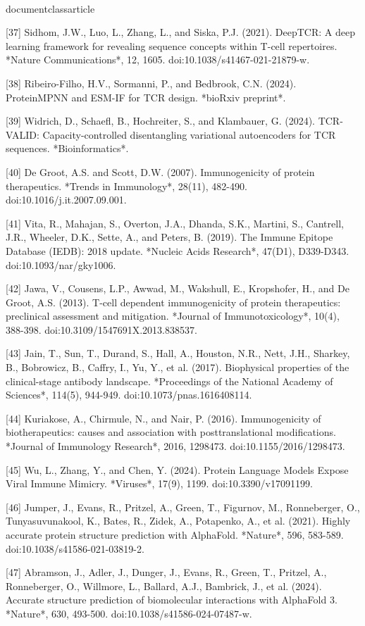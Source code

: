\\documentclass{article}
\begin{document}
[37] Sidhom, J.W., Luo, L., Zhang, L., and Siska, P.J. (2021). DeepTCR: A deep learning framework for revealing sequence concepts within T-cell repertoires. *Nature Communications*, 12, 1605. doi:10.1038/s41467-021-21879-w.

[38] Ribeiro-Filho, H.V., Sormanni, P., and Bedbrook, C.N. (2024). ProteinMPNN and ESM-IF for TCR design. *bioRxiv preprint*.

[39] Widrich, D., Schaefl, B., Hochreiter, S., and Klambauer, G. (2024). TCR-VALID: Capacity-controlled disentangling variational autoencoders for TCR sequences. *Bioinformatics*.

[40] De Groot, A.S. and Scott, D.W. (2007). Immunogenicity of protein therapeutics. *Trends in Immunology*, 28(11), 482-490. doi:10.1016/j.it.2007.09.001.

[41] Vita, R., Mahajan, S., Overton, J.A., Dhanda, S.K., Martini, S., Cantrell, J.R., Wheeler, D.K., Sette, A., and Peters, B. (2019). The Immune Epitope Database (IEDB): 2018 update. *Nucleic Acids Research*, 47(D1), D339-D343. doi:10.1093/nar/gky1006.

[42] Jawa, V., Cousens, L.P., Awwad, M., Wakshull, E., Kropshofer, H., and De Groot, A.S. (2013). T-cell dependent immunogenicity of protein therapeutics: preclinical assessment and mitigation. *Journal of Immunotoxicology*, 10(4), 388-398. doi:10.3109/1547691X.2013.838537.

[43] Jain, T., Sun, T., Durand, S., Hall, A., Houston, N.R., Nett, J.H., Sharkey, B., Bobrowicz, B., Caffry, I., Yu, Y., et al. (2017). Biophysical properties of the clinical-stage antibody landscape. *Proceedings of the National Academy of Sciences*, 114(5), 944-949. doi:10.1073/pnas.1616408114.

[44] Kuriakose, A., Chirmule, N., and Nair, P. (2016). Immunogenicity of biotherapeutics: causes and association with posttranslational modifications. *Journal of Immunology Research*, 2016, 1298473. doi:10.1155/2016/1298473.

[45] Wu, L., Zhang, Y., and Chen, Y. (2024). Protein Language Models Expose Viral Immune Mimicry. *Viruses*, 17(9), 1199. doi:10.3390/v17091199.

[46] Jumper, J., Evans, R., Pritzel, A., Green, T., Figurnov, M., Ronneberger, O., Tunyasuvunakool, K., Bates, R., Zidek, A., Potapenko, A., et al. (2021). Highly accurate protein structure prediction with AlphaFold. *Nature*, 596, 583-589. doi:10.1038/s41586-021-03819-2.

[47] Abramson, J., Adler, J., Dunger, J., Evans, R., Green, T., Pritzel, A., Ronneberger, O., Willmore, L., Ballard, A.J., Bambrick, J., et al. (2024). Accurate structure prediction of biomolecular interactions with AlphaFold 3. *Nature*, 630, 493-500. doi:10.1038/s41586-024-07487-w.
\end{document}
